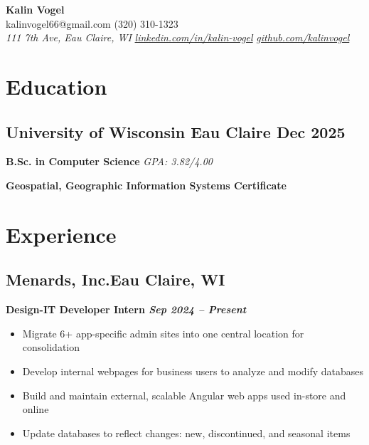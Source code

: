 \documentclass[a4paper,10pt]{article}
\newcommand{\name}[1]{\fontsize{12}{10}\selectfont \textbf{#1}}
\newcommand{\contact}[2]{#1 \hfill #2}
\newcommand{\contactinfo}[3]{\textit{#1} \hfill \textit{#2} \hfill \textit{#3}}
\begin{document}
\name{Kalin Vogel} \\
\contact{ kalinvogel66@gmail.com}{\faIcon{phone} (320) 310-1323} \\
\contactinfo{ 111 7th Ave, Eau Claire, WI}{\faIcon{linkedin} \href{https://www.linkedin.com/in/yourprofile}{linkedin.com/in/kalin-vogel}}{\faIcon{github} \href{https://github.com/yourusername}{github.com/kalinvogel}}
\section*{Education}
\subsection*{\textbf{University of Wisconsin Eau Claire} \hfill \textbf{Dec 2025}} 
\textbf{B.Sc. in Computer Science} \hfill \textit{GPA: 3.82/4.00} \\

{\fontsize{12}{18}
}
\vspace{.6em} %

\textbf{\hspace*{10pt}Geospatial, Geographic Information Systems Certificate}

\section*{Experience}
\subsection*{{Menards, Inc.}\hfill\textbf{Eau Claire, WI}}

\hspace{12pt}\textbf{{Design-IT Developer Intern} \hfill \textit{Sep 2024 – Present}} \\
\vspace{-1em}
{\fontsize{12}{15}\selectfont
\begin{itemize}[leftmargin=30pt]
    \item Migrate 6+ app-specific admin sites into one central location for consolidation
    \item Develop internal webpages for business users to analyze and modify databases
    \item Build and maintain external, scalable Angular web apps used in-store and online
    \item Update databases to reflect changes: new, discontinued, and seasonal items
\end{itemize}
}
\end{document}
